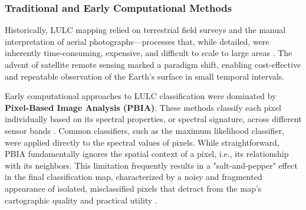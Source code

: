 \documentclass{report}
\begin{document}
\subsubsection*{Traditional and Early Computational Methods} 
Historically, LULC mapping relied on terrestrial field surveys and the manual interpretation of aerial photographs—processes that, while detailed, were inherently time-consuming, expensive, and difficult to scale to large areas \parencites[p.~2]{TalukdarEtAlLandUseLandCoverClassificationMachineLearningClassifiersSatelliteObservationsReview2020}. The advent of satellite remote sensing marked a paradigm shift, enabling cost-effective and repeatable observation of the Earth's surface in small temporal intervals. \par
Early computational approaches to LULC classification were dominated by \textbf{Pixel-Based Image Analysis (PBIA)}. These methods classify each pixel individually based on its spectral properties, or spectral signature, across different sensor bands \parencites[p.~2]{NeupaneEtAlDeepLearningBasedSemanticSegmentationUrbanFeaturesSatelliteImagesReviewMetaAnalysis2021}. Common classifiers, such as the maximum likelihood classifier, were applied directly to the spectral values of pixels. While straightforward, PBIA fundamentally ignores the spatial context of a pixel, i.e., its relationship with its neighbors. This limitation frequently results in a "salt-and-pepper" effect in the final classification map, characterized by a noisy and fragmented appearance of isolated, misclassified pixels that detract from the map's cartographic quality and practical utility \parencites[p.~2]{NeupaneEtAlDeepLearningBasedSemanticSegmentationUrbanFeaturesSatelliteImagesReviewMetaAnalysis2021}. \par
\end{document}
